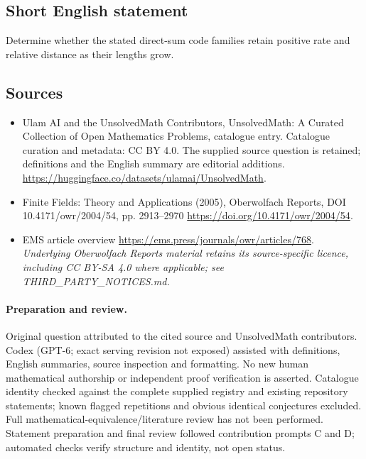 \documentclass[11pt]{article}
\begin{document}
\subsection{Short English statement}
Determine whether the stated direct-sum code families retain positive rate and relative distance as their lengths grow.
\subsection{Sources}
\begin{itemize}
\item[\hypertarget{source:statement:1}{S1}] Ulam AI and the UnsolvedMath Contributors, UnsolvedMath: A Curated Collection of Open Mathematics Problems, catalogue entry. Catalogue curation and metadata: CC BY 4.0. The supplied source question is retained; definitions and the English summary are editorial additions.
\url{https://huggingface.co/datasets/ulamai/UnsolvedMath}.
\item[\hypertarget{source:statement:2}{S2}] Finite Fields: Theory and Applications (2005), Oberwolfach Reports, DOI 10.4171/owr/2004/54, pp. 2913--2970
\url{https://doi.org/10.4171/owr/2004/54}.
\item[\hypertarget{source:statement:3}{S3}] EMS article overview
\url{https://ems.press/journals/owr/articles/768}.
\textit{Underlying Oberwolfach Reports material retains its source-specific licence, including CC BY-SA 4.0 where applicable; see THIRD\_PARTY\_NOTICES.md.}
\end{itemize}
\paragraph{Preparation and review.}
Original question attributed to the cited source and UnsolvedMath contributors. Codex (GPT-6; exact serving revision not exposed) assisted with definitions, English summaries, source inspection and formatting. No new human mathematical authorship or independent proof verification is asserted. Catalogue identity checked against the complete supplied registry and existing repository statements; known flagged repetitions and obvious identical conjectures excluded. Full mathematical-equivalence/literature review has not been performed. Statement preparation and final review followed contribution prompts C and D; automated checks verify structure and identity, not open status.
\label{end:statement}
\end{document}
